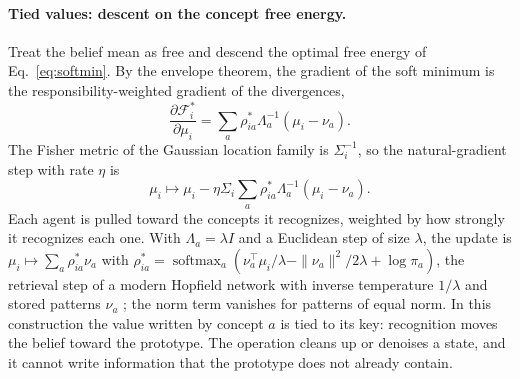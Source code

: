 \documentclass[11pt]{article}
\theoremstyle{definition}
\theoremstyle{remark}
\newcommand{\softmax}{\operatorname{softmax}}
\newcommand{\F}{\mathcal{F}}
\begin{document}
\paragraph{Tied values: descent on the concept free energy.}
Treat the belief mean as free and descend the optimal free energy of Eq.~\eqref{eq:softmin}. By the envelope theorem, the gradient of the soft minimum is the responsibility-weighted gradient of the divergences,
\begin{equation}
\frac{\partial\F_i^{*}}{\partial\mu_i}=\sum_a\rho^{*}_{ia}\Lambda_a^{-1}(\mu_i-\nu_a).
\end{equation}
The Fisher metric of the Gaussian location family is $\Sigma_i^{-1}$, so the natural-gradient step with rate $\eta$ is
\begin{equation}
\mu_i\mapsto\mu_i-\eta\Sigma_i\sum_a\rho^{*}_{ia}\Lambda_a^{-1}(\mu_i-\nu_a).
\label{eq:tied_update}
\end{equation}
Each agent is pulled toward the concepts it recognizes, weighted by how strongly it recognizes each one. With $\Lambda_a=\lambda I$ and a Euclidean step of size $\lambda$, the update is $\mu_i\mapsto\sum_a\rho^{*}_{ia}\nu_a$ with $\rho^{*}_{ia}=\softmax_a(\nu_a^{\top}\mu_i/\lambda-\|\nu_a\|^2/2\lambda+\log\pi_a)$, the retrieval step of a modern Hopfield network with inverse temperature $1/\lambda$ and stored patterns $\nu_a$ \citep{ramsauer2021}; the norm term vanishes for patterns of equal norm. In this construction the value written by concept $a$ is tied to its key: recognition moves the belief toward the prototype. The operation cleans up or denoises a state, and it cannot write information that the prototype does not already contain.
\end{document}
